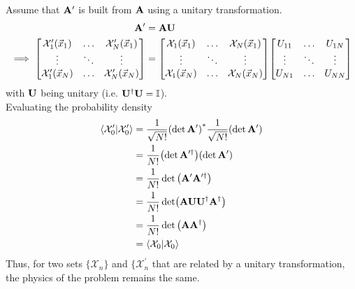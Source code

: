 \documentclass[12pt,a4paper,titlepage]{article}
\newcommand{\Chi}{\mathcal{X}} %
\newcommand{\id}{\mathbb{I}} %
\begin{document}
\newpage
Assume that $\vb{A}^{\prime}$ is built from $\vb{A}$ using a unitary transformation.
\begin{equation}
\begin{aligned}
\vb{A}^{\prime}&=\vb{A}\vb{U}\\
\implies\mqty[\Chi_{1}^{\prime}(\vec{x}_{1}) & \ldots & \Chi_{N}^{\prime}(\vec{x}_{1})\\ \vdots & \ddots & \vdots \\ \Chi_{1}^{\prime}(\vec{x}_{N}) & \ldots & \Chi_{N}^{\prime}(\vec{x}_{N})]&=\mqty[\Chi_{1}(\vec{x}_{1}) & \ldots & \Chi_{N}(\vec{x}_{1})\\ \vdots & \ddots & \vdots \\ \Chi_{1}(\vec{x}_{N}) & \ldots & \Chi_{N}(\vec{x}_{N})]\mqty[U_{11} & \ldots & U_{1N} \\ \vdots & \ddots & \vdots \\ U_{N1} & \ldots & U_{NN}]
\end{aligned}
\end{equation}
with $\vb{U}$ being unitary (i.e. $\vb{U}^{\dagger}\vb{U}=\id$).\\

Evaluating the probability density
\begin{equation}
\begin{aligned}
\ip{\Chi_{0}^{\prime}}{\Chi_{0}^{\prime}}&=\frac{1}{\sqrt{N!}}\qty(\det\vb{A}^{\prime})^{*}\frac{1}{\sqrt{N!}}\qty(\det\vb{A}^{\prime})\\
&=\frac{1}{N!}\qty(\det\vb{A}^{\prime\dagger})\qty(\det\vb{A}^{\prime})\\
&=\frac{1}{N!}\det\qty(\vb{A}^{\prime}\vb{A}^{\prime\dagger})\\
&=\frac{1}{N!}\det(\vb{A}\vb{U}\vb{U}^{\dagger}\vb{A}^{\dagger})\\
&=\frac{1}{N!}\det\qty(\vb{A}\vb{A}^{\dagger})\\
&=\ip{\Chi_{0}}{\Chi_{0}}
\end{aligned}
\end{equation}
Thus, for two sets $\{\Chi_{n}\}$ and $\{\Chi_{n}^{\prime}$ that are related by a unitary transformation, the physics of the problem remains the same.

\newpage
\end{document}
